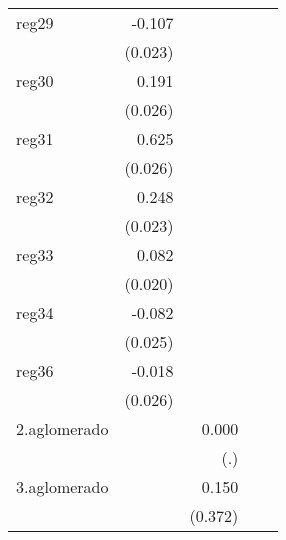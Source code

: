 {\begin{longtable}{l*{4}{D{.}{.}{-1}}}
\addlinespace
reg29       &      -0.107\sym{***}&                     &                     &                     \\
            &     (0.023)         &                     &                     &                     \\
\addlinespace
reg30       &       0.191\sym{***}&                     &                     &                     \\
            &     (0.026)         &                     &                     &                     \\
\addlinespace
reg31       &       0.625\sym{***}&                     &                     &                     \\
            &     (0.026)         &                     &                     &                     \\
\addlinespace
reg32       &       0.248\sym{***}&                     &                     &                     \\
            &     (0.023)         &                     &                     &                     \\
\addlinespace
reg33       &       0.082\sym{***}&                     &                     &                     \\
            &     (0.020)         &                     &                     &                     \\
\addlinespace
reg34       &      -0.082\sym{**} &                     &                     &                     \\
            &     (0.025)         &                     &                     &                     \\
\addlinespace
reg36       &      -0.018         &                     &                     &                     \\
            &     (0.026)         &                     &                     &                     \\
\addlinespace
2.aglomerado&                     &       0.000         &                     &                     \\
            &                     &         (.)         &                     &                     \\
\addlinespace
3.aglomerado&                     &       0.150         &                     &                     \\
            &                     &     (0.372)         &                     &                     \\

\end{longtable}}
